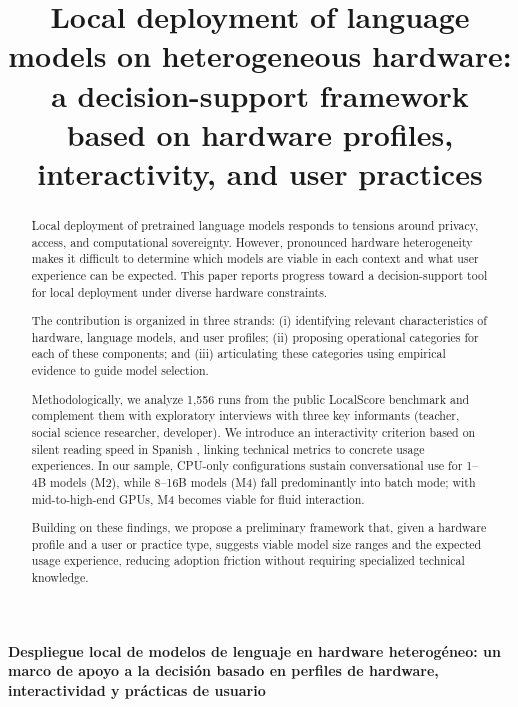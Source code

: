 \documentclass{llncs}
\begin{document}
\title{Local deployment of language models on heterogeneous hardware:
a decision-support framework based on hardware profiles,
interactivity, and user
practices}
\author{}
\institute{}
\maketitle

\begin{abstract}

Local deployment of pretrained language models responds to tensions around privacy, access, and computational sovereignty. However, pronounced hardware heterogeneity makes it difficult to determine which models are viable in each context and what user experience can be expected. This paper reports progress toward a decision-support tool for local deployment under diverse hardware constraints.

The contribution is organized in three strands: (i) identifying relevant characteristics of hardware, language models, and user profiles; (ii) proposing operational categories for each of these components; and (iii) articulating these categories using empirical evidence to guide model selection.

Methodologically, we analyze 1,556 runs from the public LocalScore benchmark and complement them with exploratory interviews with three key informants (teacher, social science researcher, developer). We introduce an interactivity criterion based on silent reading speed in Spanish \parencite{brysbaert2019}, linking technical metrics to concrete usage experiences. In our sample, CPU-only configurations sustain conversational use for 1--4B models (M2), while 8--16B models (M4) fall predominantly into batch mode; with mid-to-high-end GPUs, M4 becomes viable for fluid interaction.

Building on these findings, we propose a preliminary framework that, given a hardware profile and a user or practice type, suggests viable model size ranges and the expected usage experience, reducing adoption friction without requiring specialized technical knowledge.

\end{abstract}

\begin{center}
\vspace{1cm}
{\Large \bfseries Despliegue local de modelos de lenguaje en hardware heterogéneo:
un marco de apoyo a la decisión basado en perfiles de hardware,
interactividad y prácticas de
usuario}
\vspace{0.5cm}
\end{center}
\end{document}
